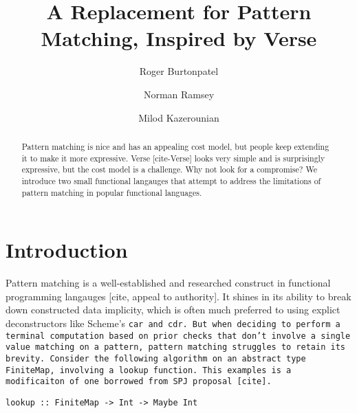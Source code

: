 \documentclass[manuscript,screen,review, 12pt]{acmart}
\begin{document}
\title{A Replacement for Pattern Matching, Inspired by Verse}

\author{Roger Burtonpatel}

\author{Norman Ramsey}

\author{Milod Kazerounian}

\renewcommand{\shortauthors}{Burtonpatel et al.}

\begin{abstract}
  Pattern matching is nice and has an appealing cost model, but people keep
  extending it to make it more expressive. Verse [cite-Verse] looks very simple
  and is surprisingly expressive, but the cost model is a challenge. Why not
  look for a compromise? We introduce two small functional langauges that
  attempt to address the limitations of pattern matching in popular functional
  languages.
  \end{abstract}

\maketitle

\section{Introduction}
Pattern matching is a well-established and researched construct in functional
programming langauges [cite, appeal to authority]. It shines in its ability to
break down constructed data implicity, which is often much preferred to using
explict deconstructors like Scheme's \tt{car} and \tt{cdr}. But when deciding to
perform a terminal computation based on prior checks that don't involve a single
value matching on a pattern, pattern matching struggles to retain its brevity.
Consider the following algorithm on an abstract type \tt{FiniteMap}, involving a
lookup function. This examples is a modificaiton of one borrowed from SPJ
proposal [cite]. 

\begin{center}
\tt{lookup :: FiniteMap -> Int -> Maybe Int}
\end{center}
\end{document}
